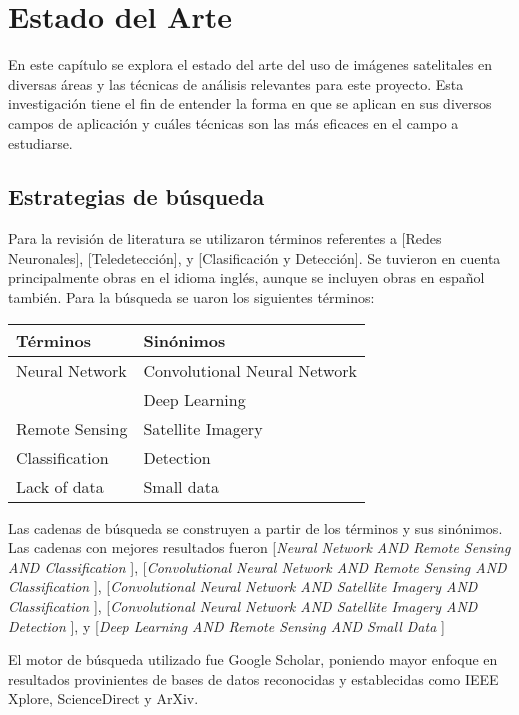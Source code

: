 \section{Estado del Arte}

En este capítulo se explora el estado del arte del uso de imágenes satelitales en diversas áreas y las técnicas de
análisis relevantes para este proyecto. Esta investigación tiene el fin de entender la forma en que se aplican en sus
diversos campos de aplicación y cuáles técnicas son las más eficaces en el campo a estudiarse.

\subsection{Estrategias de búsqueda}

Para la revisión de literatura se utilizaron términos referentes a [Redes Neuronales], [Teledetección], y
[Clasificación y Detección]. Se tuvieron en cuenta principalmente obras en el idioma inglés, aunque se incluyen obras
en español también. Para la búsqueda se uaron los siguientes términos:

\begin{center}
    \begin{tabular}{ l | l }
        {\bf Términos } & {\bf Sinónimos } \\
        \hline
        Neural Network & Convolutional Neural Network \\
                       & Deep Learning \\
        \hline
        Remote Sensing & Satellite Imagery \\
        \hline
        Classification & Detection \\
        \hline
        Lack of data & Small data \\
    \end{tabular}
\end{center}

Las cadenas de búsqueda se construyen a partir de los términos y sus sinónimos. Las cadenas con mejores resultados
fueron
[{\it Neural Network AND Remote Sensing AND Classification }],
[{\it Convolutional Neural Network AND Remote Sensing AND Classification }],
[{\it Convolutional Neural Network AND Satellite Imagery AND Classification }],
[{\it Convolutional Neural Network AND Satellite Imagery AND Detection }], y
[{\it Deep Learning AND Remote Sensing AND Small Data }]

El motor de búsqueda utilizado fue Google Scholar, poniendo mayor enfoque en resultados provinientes de bases de datos
reconocidas y establecidas como IEEE Xplore, ScienceDirect y ArXiv.

